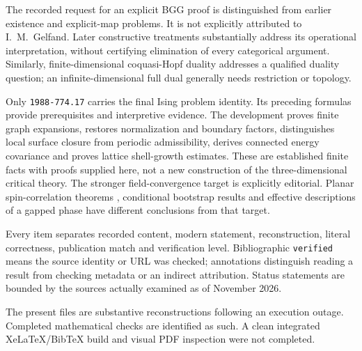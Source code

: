 The recorded request for an explicit BGG proof is distinguished from
earlier existence and explicit-map problems. It is not explicitly
attributed to I.\ M.\ Gelfand. Later constructive treatments substantially
address its operational interpretation, without certifying elimination
of every categorical argument. Similarly, finite-dimensional
coquasi-Hopf duality addresses a qualified duality question; an
infinite-dimensional full dual generally needs restriction or topology.

Only \texttt{1988-774.17} carries the final Ising problem identity.
Its preceding formulas provide prerequisites and interpretive evidence.
The development proves finite graph expansions, restores normalization
and boundary factors, distinguishes local surface closure from periodic
admissibility, derives connected energy covariance and proves lattice
shell-growth estimates. These are established finite facts with proofs
supplied here, not a new construction of the three-dimensional critical
theory. The stronger field-convergence target is explicitly editorial.
Planar spin-correlation theorems \citep{chelkak2015spin}, conditional
bootstrap results and effective descriptions of a gapped phase have
different conclusions from that target.

Every item separates recorded content, modern statement, reconstruction,
literal correctness, publication match and verification level.
Bibliographic \texttt{verified} means the source identity or URL was
checked; annotations distinguish reading a result from checking metadata
or an indirect attribution. Status statements are bounded by the sources
actually examined as of November 2026.

The present files are substantive reconstructions following an execution
outage. Completed mathematical checks are identified as such. A clean
integrated XeLaTeX/BibTeX build and visual PDF inspection were not
completed.
